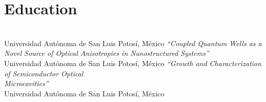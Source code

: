 \documentclass[letterpaper,dvipsnames]{twentysecondcv} %
\begin{document}

\aboutme{} %







\makeprofile %



\section{Education}

\begin{twenty} %
	                       {\\Universidad Aut\'onoma de San Luis Potos\'i, M\'exico}
	                       {\emph{``Coupled Quantum Wells as a Novel Source of Optical Anisotropies in
						   Nanostructured Systems''}}
	                      {\\Universidad Aut\'onoma de San Luis Potos\'i, M\'exico}
	                      {\emph{``Growth and Characterization of Semiconductor Optical \\ Microcavities''}}
	                      {\\Universidad Aut\'onoma de San Luis Potos\'i, M\'exico}
	                      {}
	
\end{twenty}
\end{document}
